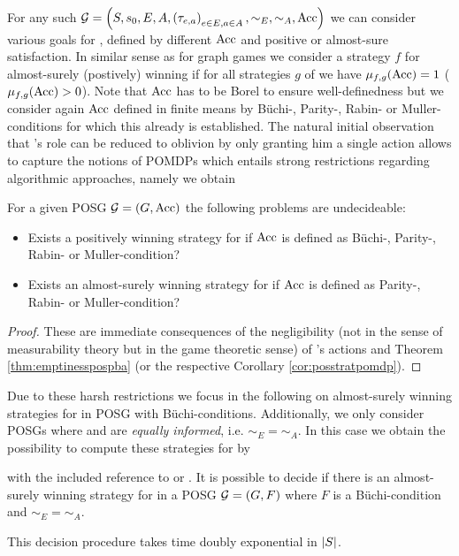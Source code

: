 For any such $\mathcal{G} = \left(
S, s_{0}, E, A, \left(\tau_{e,a}\right)_{e\in E, a\in A}, \sim_{E}, \sim_{A}, \operatorname{Acc}\right)$ 
we can consider various goals for \eve{}, defined by different $\operatorname{Acc}$ and
positive or almost-sure satisfaction. In similar sense as for graph games we
consider a strategy $f$ for \eve{} almost-surely (postively) winning if for all
strategies $g$ of \adam{} we have $\mu_{f,g}(\operatorname{Acc}) = 1$ 
($\mu_{f,g}(\operatorname{Acc}) > 0$). Note that $\operatorname{Acc}$ has to be Borel to ensure 
well-definedness but we consider again $\operatorname{Acc}$ defined in finite means by 
Büchi-, Parity-, Rabin- or Muller-conditions for which this already is 
established. The natural initial observation that \adam{}'s role can be reduced 
to oblivion by only granting him a single action allows to capture the notions
of \acp{POMDP} which entails strong restrictions regarding algorithmic 
approaches, namely we obtain
\begin{corollary}
  \cite{PureStratPOSG, POSG}
  For a given \ac{POSG} $\mathcal{G} = \left(G, \operatorname{Acc}\right)$ the following problems
  are undecideable:
  \begin{itemize}
    \item Exists a positively winning strategy for \eve{} if $\operatorname{Acc}$ is defined 
      as Büchi-, Parity-, Rabin- or Muller-condition?
    \item Exists an almost-surely winning strategy for \eve{} if $\operatorname{Acc}$ is
      defined as Parity-, Rabin- or Muller-condition?
  \end{itemize}
\end{corollary}
\begin{proof}
  These are immediate consequences of the negligibility (not in the sense of
  measurability theory but in the game theoretic sense) of \adam{}'s actions
  and Theorem \ref{thm:emptinesspospba} (or the respective Corollary 
  \ref{cor:posstratpomdp}).
\end{proof}
Due to these harsh restrictions we focus in the following on almost-surely 
winning strategies for \eve{} in \ac{POSG} with Büchi-conditions. Additionally,
we only consider \acp{POSG} where \eve{} and \adam{} are 
\emph{equally informed}, i.e. $\sim_{E} = \sim_{A}$. In this case
we obtain the possibility to compute these strategies for \eve{} by
\begin{theorem}
  \cite[Theorem 6]{POSG} with the included reference to 
  \cite[Lemma 4]{DecProblemsForProbAuto} or \cite[Theorem 5.3]{PureStratPOSG}.
  It is possible to decide if there is an almost-surely winning strategy for 
  \eve{} in a \ac{POSG} $\mathcal{G} = \left(G, F\right)$ where $F$ is a 
  Büchi-condition and $\sim_{E} = \sim_{A}$.

  This decision procedure takes time doubly exponential in $\left\vert{S}\right\vert$.
  \label{thm:StratPOSG}
\end{theorem}
